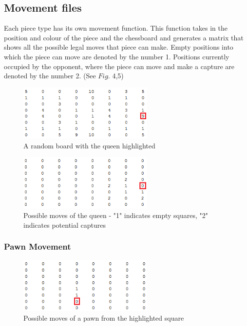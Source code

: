 \documentclass[11pt,a4paper]{article}
\begin{document}
\subsection{Movement files}
\indent\indent Each piece type has its own movement function. This function takes in the position and colour of the piece and the chessboard and generates a matrix that shows all the possible legal moves that piece can make. Empty positions into which the piece can move are denoted by the number 1. Positions currently occupied by the opponent, where the piece can move and make a capture are denoted by the number 2. (See $Fig.$ 4,5)

\begin{figure}[H]
\centering
\includegraphics[width=0.6\textwidth]{random_board}
\caption{A random board with the queen highlighted}
\label{fig:chess1}
\end{figure}

\begin{figure}[H]
\centering
\includegraphics[width=0.6\textwidth]{queen_capture}
\caption{Possible moves of the queen - "1" indicates empty squares, "2" indicates potential captures}
\label{fig:chess1}
\end{figure}

\subsubsection{Pawn Movement}
\begin{figure}[H]
\centering
\includegraphics[width=0.6\textwidth]{pawn_movement}
\caption{Possible moves of a pawn from the highlighted square}
\label{fig:chess1}
\end{figure}
\end{document}
